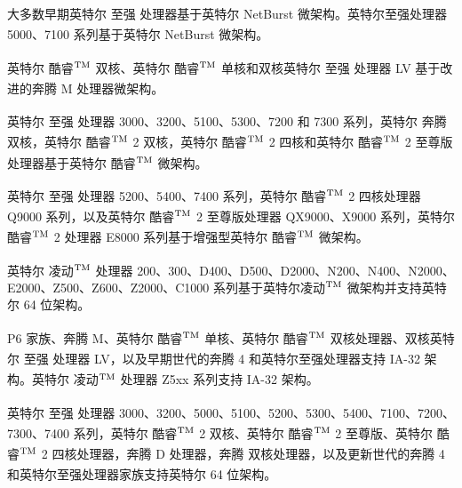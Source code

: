 \documentclass{article}
\begin{document}
大多数早期英特尔\textsuperscript{\textregistered} 至强\textsuperscript{\textregistered} 处理器基于英特尔 NetBurst\textsuperscript{\textregistered} 微架构。英特尔至强处理器 5000、7100 系列基于英特尔 NetBurst\textsuperscript{\textregistered} 微架构。

英特尔\textsuperscript{\textregistered} 酷睿$^{\rm{TM}}$ 双核、英特尔\textsuperscript{\textregistered} 酷睿$^{\rm{TM}}$ 单核和双核英特尔\textsuperscript{\textregistered} 至强\textsuperscript{\textregistered} 处理器 LV 基于改进的奔腾\textsuperscript{\textregistered} M 处理器微架构。

英特尔\textsuperscript{\textregistered} 至强\textsuperscript{\textregistered} 处理器 3000、3200、5100、5300、7200 和 7300 系列，英特尔\textsuperscript{\textregistered} 奔腾\textsuperscript{\textregistered} 双核，英特尔\textsuperscript{\textregistered} 酷睿$^{\rm{TM}}$ 2 双核，英特尔\textsuperscript{\textregistered} 酷睿$^{\rm{TM}}$ 2 四核和英特尔\textsuperscript{\textregistered} 酷睿$^{\rm{TM}}$ 2 至尊版处理器基于英特尔\textsuperscript{\textregistered} 酷睿$^{\rm{TM}}$ 微架构。

英特尔\textsuperscript{\textregistered} 至强\textsuperscript{\textregistered} 处理器 5200、5400、7400 系列，英特尔\textsuperscript{\textregistered} 酷睿$^{\rm{TM}}$ 2 四核处理器 Q9000 系列，以及英特尔\textsuperscript{\textregistered} 酷睿$^{\rm{TM}}$ 2 至尊版处理器 QX9000、X9000 系列，英特尔\textsuperscript{\textregistered} 酷睿$^{\rm{TM}}$ 2 处理器 E8000 系列基于增强型英特尔\textsuperscript{\textregistered} 酷睿$^{\rm{TM}}$ 微架构。

英特尔\textsuperscript{\textregistered} 凌动$^{\rm{TM}}$ 处理器 200、300、D400、D500、D2000、N200、N400、N2000、E2000、Z500、Z600、Z2000、C1000 系列基于英特尔凌动$^{\rm{TM}}$ 微架构并支持英特尔 64 位架构。

P6 家族、奔腾\textsuperscript{\textregistered} M、英特尔\textsuperscript{\textregistered} 酷睿$^{\rm{TM}}$ 单核、英特尔\textsuperscript{\textregistered} 酷睿$^{\rm{TM}}$ 双核处理器、双核英特尔\textsuperscript{\textregistered} 至强\textsuperscript{\textregistered} 处理器 LV，以及早期世代的奔腾 4 和英特尔至强处理器支持 IA-32 架构。英特尔\textsuperscript{\textregistered} 凌动$^{\rm{TM}}$ 处理器 Z5xx 系列支持 IA-32 架构。

英特尔\textsuperscript{\textregistered} 至强\textsuperscript{\textregistered} 处理器 3000、3200、5000、5100、5200、5300、5400、7100、7200、7300、7400 系列，英特尔\textsuperscript{\textregistered} 酷睿$^{\rm{TM}}$ 2 双核、英特尔\textsuperscript{\textregistered} 酷睿$^{\rm{TM}}$ 2 至尊版、英特尔\textsuperscript{\textregistered} 酷睿$^{\rm{TM}}$ 2 四核处理器，奔腾\textsuperscript{\textregistered} D 处理器，奔腾\textsuperscript{\textregistered} 双核处理器，以及更新世代的奔腾 4 和英特尔至强处理器家族支持英特尔\textsuperscript{\textregistered} 64 位架构。
\end{document}
